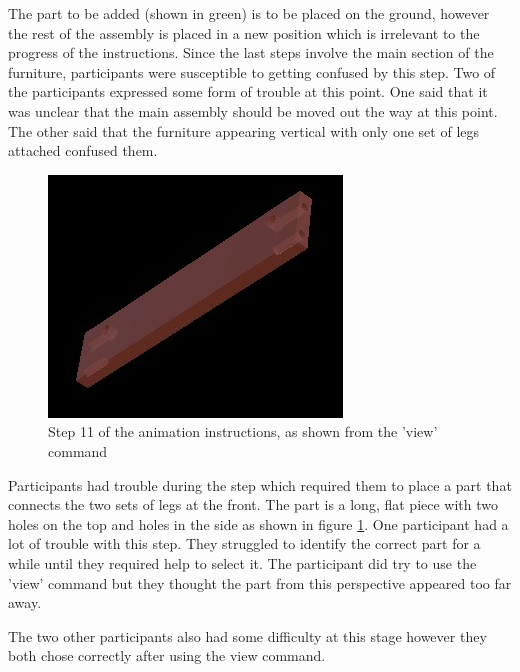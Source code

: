 \documentclass{l4proj}
\begin{document}
The part to be added (shown in green) is to be placed on the ground, however the rest of the assembly is placed in a new position which is irrelevant to the progress of the instructions. Since the last steps involve the main section of the furniture, participants were susceptible to getting confused by this step. Two of the participants expressed some form of trouble at this point. One said that it was unclear that the main assembly should be moved out the way at this point. The other said that the furniture appearing vertical with only one set of legs attached confused them.

\begin{figure}[hbt!]
    \centering
    \includegraphics[width=0.4\linewidth]{dissertation//images/animationConnector.jpg}
    \caption{Step 11 of the animation instructions, as shown from the 'view' command}
    \label{fig:anim11}
\end{figure}

Participants had trouble during the step which required them to place a part that connects the two sets of legs at the front. The part is a long, flat piece with two holes on the top and holes in the side as shown in figure \ref{fig:anim11}. One participant had a lot of trouble with this step. They struggled to identify the correct part for a while until they required help to select it. The participant did try to use the 'view' command but they thought the part from this perspective appeared too far away.

The two other participants also had some difficulty at this stage however they both chose correctly after using the view command.
\end{document}

